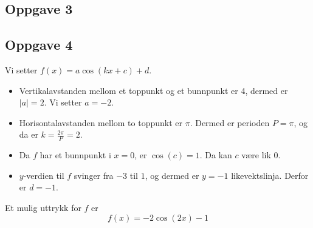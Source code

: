\subsection*{Oppgave 3}

\subsection*{Oppgave 4}
Vi setter $f(x)=a\cos(kx+c)+d$.
\begin{itemize}
	\item Vertikalavstanden mellom et toppunkt og et bunnpunkt er 4, dermed er $|a|=2$. Vi setter $a=-2$.
	\item Horisontalavstanden mellom to toppunkt er $\pi$. Dermed er perioden $P=\pi$, og da er $k=\frac{2\pi}{P}=2$.
	\item Da $f$ har et bunnpunkt i $x=0$, er $\cos(c)=1$. Da kan $c$ være lik 0.
	\item $y$-verdien til $f$ svinger fra $-3$ til $1$, og dermed er $y=-1$ likevektslinja. Derfor er $d=-1$.
\end{itemize}
Et mulig uttrykk for $f$ er
\[ f(x)=-2\cos\left(2x\right)-1 \]

